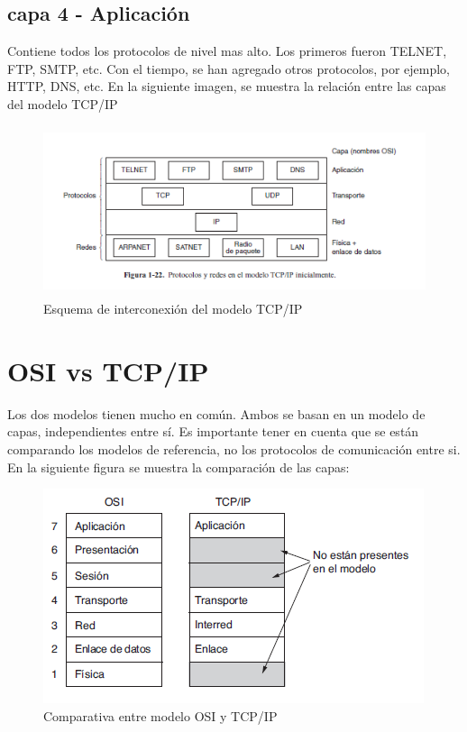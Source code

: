 \subsection{capa 4 - Aplicación}
Contiene todos los protocolos de nivel mas alto. Los primeros fueron TELNET, FTP, SMTP, etc. Con el tiempo, se han agregado otros protocolos, por ejemplo, HTTP, DNS, etc. 
En la siguiente imagen, se muestra la relación entre las capas del modelo TCP/IP
\begin{figure}[ht]
	\centering
	\includegraphics[height=5.0cm]{cap_ap_tcpip}
	\caption{Esquema de interconexión del modelo TCP/IP}
\end{figure}


\section{OSI vs TCP/IP }

Los dos modelos tienen mucho en común. Ambos se basan en un modelo de capas, independientes entre sí. Es importante tener en cuenta que se están comparando los modelos de referencia, no los protocolos de comunicación entre si. En la siguiente figura se muestra la comparación de las capas:  

\begin{figure}[ht]
	\centering 
	\includegraphics{comptcposi}
	\caption{Comparativa entre modelo OSI y TCP/IP}
	\label{fig:comp_tcposi}
\end{figure}

